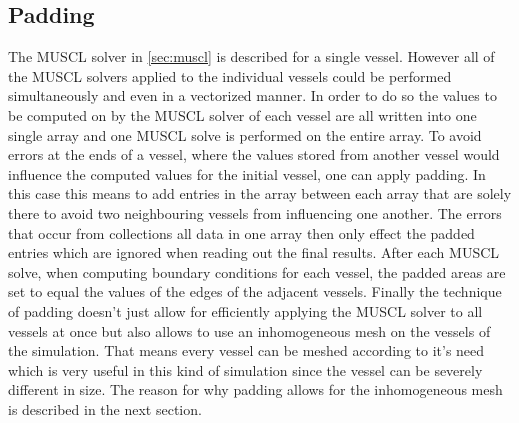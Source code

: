 \documentclass[a4paper, oneside]{discothesis}
\begin{document}
							\subsection{Padding} \label{sec:pdd}
							The MUSCL solver in \autoref{sec:muscl} is described for a single vessel.
							However all of the MUSCL solvers applied to the individual vessels could be performed simultaneously and even in a vectorized manner.
							In order to do so the values to be computed on by the MUSCL solver of each vessel are all written into one single array and one MUSCL solve is performed on the entire array.
							To avoid errors at the ends of a vessel, where the values stored from another vessel would influence the computed values for the initial vessel, one can apply padding.
							In this case this means to add entries in the array between each array that are solely there to avoid two neighbouring vessels from influencing one another.
							The errors that occur from collections all data in one array then only effect the padded entries which are ignored when reading out the final results.
							After each MUSCL solve, when computing boundary conditions for each vessel, the padded areas are set to equal the values of the edges of the adjacent vessels.
							Finally the technique of padding doesn't just allow for efficiently applying the MUSCL solver to all vessels at once but also allows to use an inhomogeneous mesh on the vessels of the simulation.
							That means every vessel can be meshed according to it's need which is very useful in this kind of simulation since the vessel can be severely different in size.
							The reason for why padding allows for the inhomogeneous mesh is described in the next section.
\end{document}
